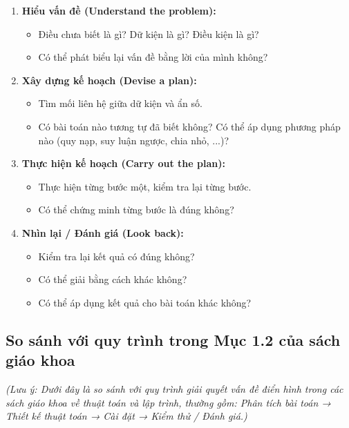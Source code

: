 \documentclass[12pt,a4paper]{article}
\begin{document}
\begin{enumerate}
    \item \textbf{Hiểu vấn đề (Understand the problem):}
    \begin{itemize}
        \item Điều chưa biết là gì? Dữ kiện là gì? Điều kiện là gì?
        \item Có thể phát biểu lại vấn đề bằng lời của mình không?
    \end{itemize}
    
    \item \textbf{Xây dựng kế hoạch (Devise a plan):}
    \begin{itemize}
        \item Tìm mối liên hệ giữa dữ kiện và ẩn số.
        \item Có bài toán nào tương tự đã biết không? Có thể áp dụng phương pháp nào (quy nạp, suy luận ngược, chia nhỏ, ...)?
    \end{itemize}
    
    \item \textbf{Thực hiện kế hoạch (Carry out the plan):}
    \begin{itemize}
        \item Thực hiện từng bước một, kiểm tra lại từng bước.
        \item Có thể chứng minh từng bước là đúng không?
    \end{itemize}
    
    \item \textbf{Nhìn lại / Đánh giá (Look back):}
    \begin{itemize}
        \item Kiểm tra lại kết quả có đúng không?
        \item Có thể giải bằng cách khác không?
        \item Có thể áp dụng kết quả cho bài toán khác không?
    \end{itemize}
\end{enumerate}

\subsection*{So sánh với quy trình trong Mục 1.2 của sách giáo khoa}

\textit{(Lưu ý: Dưới đây là so sánh với quy trình giải quyết vấn đề điển hình trong các sách giáo khoa về thuật toán và lập trình, thường gồm: Phân tích bài toán → Thiết kế thuật toán → Cài đặt → Kiểm thử / Đánh giá.)}
\end{document}
